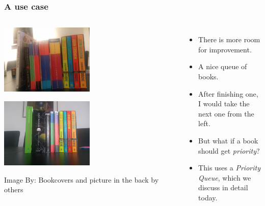 \begin{frame}
	\frametitle{A use case}
	\begin{columns}
	\begin{center}

					\includegraphics[width=0.5\textwidth]{images/books_read.jpg}
	
					\includegraphics[width=0.5\textwidth]{images/books_unread.jpg}

{\scriptsize Image By:}
{\scriptsize Bookcovers and picture in the back by others}
	\end{center}
		\begin{itemize}
			\item There is more room for improvement.
				
			\item A nice \alert{queue} of books.
				
			\item After finishing one, I would take the next one from the left.
				
			\item But what if a book should get \textit{priority}?
				
			\item This uses a \textit{Priority Queue}, which we discuss in detail today.
		\end{itemize}
	\end{columns}
\end{frame}



